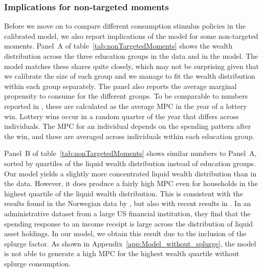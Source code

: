 \documentclass[\econtexRoot/HAFiscal]{subfiles}
\begin{document}
\hypertarget{non-targeted-moments}{}\par\subsubsection{Implications for non-targeted moments} 
\notinsubfile{\label{sec:nonTargetedMoments}}

Before we move on to compare different consumption stimulus policies in the calibrated model, we also report implications of the model for some non-targeted moments.
Panel~A of table~\ref{tab:nonTargetedMoments} shows the wealth distribution across the three education groups in the data and in the model.
The model matches these shares quite closely, which may not be surprising given that we calibrate the size of each group and we manage to fit the wealth distribution within each group separately.
The panel also reports the average marginal propensity to consume for the different groups.
To be comparable to numbers reported in \citet{fagereng_mpc_2021}, these are calculated as the average MPC in the year of a lottery win.
Lottery wins occur in a random quarter of the year that differs across individuals.
The MPC for an individual depends on the spending pattern after the win, and these are averaged across individuals within each education group.


Panel~B of table~\ref{tab:nonTargetedMoments} shows similar numbers to Panel~A, sorted by quartiles of the liquid wealth distribution instead of education groups.
Our model yields a slightly more concentrated liquid wealth distribution than in the data.
However, it does produce a fairly high MPC even for households in the highest quartile of the liquid wealth distribution.
This is consistent with the results found in the Norwegian data by \citet{fagereng_mpc_2021}, but also with recent results in \citet{graham2024mental}.
In an administrative dataset from a large US financial institution, they find that the spending response to an income receipt is large across the distribution of liquid asset holdings.
In our model, we obtain this result due to the inclusion of the splurge factor.
As shown in Appendix~\ref{app:Model_without_splurge}, the model is not able to generate a high MPC for the highest wealth quartile without splurge consumption.
\end{document}
